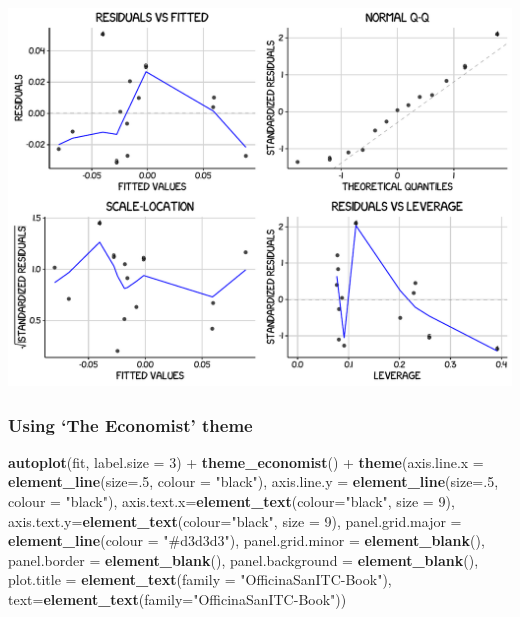 \documentclass[]{article}
\newenvironment{Shaded}{\begin{snugshade}}{\end{snugshade}}
\newcommand{\KeywordTok}[1]{\textcolor[rgb]{0.13,0.29,0.53}{\textbf{{#1}}}}
\newcommand{\DataTypeTok}[1]{\textcolor[rgb]{0.13,0.29,0.53}{{#1}}}
\newcommand{\DecValTok}[1]{\textcolor[rgb]{0.00,0.00,0.81}{{#1}}}
\newcommand{\StringTok}[1]{\textcolor[rgb]{0.31,0.60,0.02}{{#1}}}
\newcommand{\NormalTok}[1]{{#1}}
\begin{document}
\begin{center}\includegraphics{0_all_posts_pdf/lr_20-1} \end{center}

\subsubsection{\texorpdfstring{Using `The Economist'
theme}{Using The Economist theme}}\label{using-the-economist-theme-11}

\begin{Shaded}
\begin{Highlighting}[]
\KeywordTok{autoplot}\NormalTok{(fit, }\DataTypeTok{label.size =} \DecValTok{3}\NormalTok{) +}\StringTok{ }\KeywordTok{theme_economist}\NormalTok{() +}
\StringTok{      }\KeywordTok{theme}\NormalTok{(}\DataTypeTok{axis.line.x =} \KeywordTok{element_line}\NormalTok{(}\DataTypeTok{size=}\NormalTok{.}\DecValTok{5}\NormalTok{, }\DataTypeTok{colour =} \StringTok{"black"}\NormalTok{),}
            \DataTypeTok{axis.line.y =} \KeywordTok{element_line}\NormalTok{(}\DataTypeTok{size=}\NormalTok{.}\DecValTok{5}\NormalTok{, }\DataTypeTok{colour =} \StringTok{"black"}\NormalTok{), }
            \DataTypeTok{axis.text.x=}\KeywordTok{element_text}\NormalTok{(}\DataTypeTok{colour=}\StringTok{"black"}\NormalTok{, }\DataTypeTok{size =} \DecValTok{9}\NormalTok{), }
            \DataTypeTok{axis.text.y=}\KeywordTok{element_text}\NormalTok{(}\DataTypeTok{colour=}\StringTok{"black"}\NormalTok{, }\DataTypeTok{size =} \DecValTok{9}\NormalTok{),}
            \DataTypeTok{panel.grid.major =} \KeywordTok{element_line}\NormalTok{(}\DataTypeTok{colour =} \StringTok{"#d3d3d3"}\NormalTok{), }
            \DataTypeTok{panel.grid.minor =} \KeywordTok{element_blank}\NormalTok{(), }
            \DataTypeTok{panel.border =} \KeywordTok{element_blank}\NormalTok{(), }\DataTypeTok{panel.background =} \KeywordTok{element_blank}\NormalTok{(),}
            \DataTypeTok{plot.title =} \KeywordTok{element_text}\NormalTok{(}\DataTypeTok{family =} \StringTok{"OfficinaSanITC-Book"}\NormalTok{),}
            \DataTypeTok{text=}\KeywordTok{element_text}\NormalTok{(}\DataTypeTok{family=}\StringTok{"OfficinaSanITC-Book"}\NormalTok{))}
\end{Highlighting}
\end{Shaded}
\end{document}
